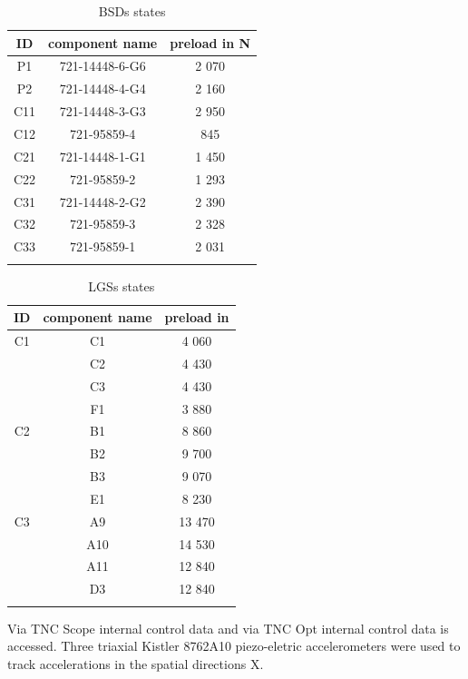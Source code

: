 \begin{center}
\begin{longtable}{||c c c||} 
 \hline
 ID & component name & preload in N \\ [0.5ex] 
 \hline
 P1 & 721-14448-6-G6 & 2 070 \\ 
 P2 & 721-14448-4-G4 & 2 160 \\ 
 C11 & 721-14448-3-G3 & 2 950 \\ 
 C12 & 721-95859-4 & 845 \\ 
 C21  & 721-14448-1-G1 & 1 450 \\ [1ex] 
 C22  & 721-95859-2 & 1 293 \\ [1ex] 
 C31  & 721-14448-2-G2 & 2 390 \\ [1ex] 
 C32  & 721-95859-3 & 2 328 \\ [1ex] 
 C33 & 721-95859-1 & 2 031 \\ [1ex]
   \hline
\caption {BSDs states}
\label {tab:BSDs_states}
\end{longtable}
\end{center}


\begin{center}
\begin{longtable}{||c c c||} 
 \hline
 ID & component name & preload in  \\ [0.5ex] 
 \hline\hline
 C1 & C1 & 4 060 \\ 
    & C2 & 4 430 \\ 
    & C3 & 4 430 \\
    & F1 & 3 880 \\ 
 \hline
 C2 & B1 & 8 860 \\ 
    & B2 & 9 700 \\ [1ex] 
    & B3 & 9 070 \\ [1ex]
    & E1 & 8 230 \\ [1ex]
 \hline
 C3 & A9 & 13 470 \\ 
    & A10 & 14 530 \\ [1ex] 
    & A11 & 12 840 \\ [1ex]
    & D3 & 12 840 \\ [1ex]
 \hline
\caption {LGSs states}
\label {tab:LGSs_states}
\end{longtable}
\end{center}

 Via TNC Scope internal control data and via TNC Opt internal control data is accessed. Three triaxial Kistler 8762A10 piezo-eletric accelerometers were used to track accelerations in the spatial directions X.


